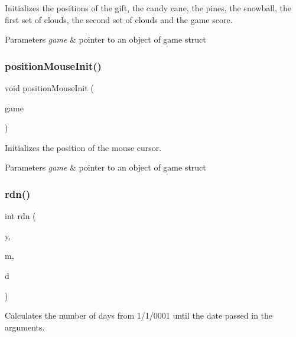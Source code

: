 Initializes the positions of the gift, the candy cane, the pines, the snowball, the first set of clouds, the second set of clouds and the game score. 


\begin{DoxyParams}{Parameters}
{\em game} & pointer to an object of game struct \\
\hline
\end{DoxyParams}
\mbox{\label{group___graphics_ga16103b3c6b6139878e7c3de81cf56925}} 
\subsubsection{\texorpdfstring{position\+Mouse\+Init()}{positionMouseInit()}}
{\footnotesize\ttfamily void position\+Mouse\+Init (\begin{DoxyParamCaption}\item[{\hyperlink{struct_game}{Game} $\ast$}]{game }\end{DoxyParamCaption})}



Initializes the position of the mouse cursor. 


\begin{DoxyParams}{Parameters}
{\em game} & pointer to an object of game struct \\
\hline
\end{DoxyParams}
\mbox{\label{group___graphics_ga0e4bd2e0f0b7e0074f5c00a2373ef7b8}} 
\subsubsection{\texorpdfstring{rdn()}{rdn()}}
{\footnotesize\ttfamily int rdn (\begin{DoxyParamCaption}\item[{unsigned long}]{y,  }\item[{unsigned long}]{m,  }\item[{unsigned long}]{d }\end{DoxyParamCaption})}



Calculates the number of days from 1/1/0001 until the date passed in the arguments. 


